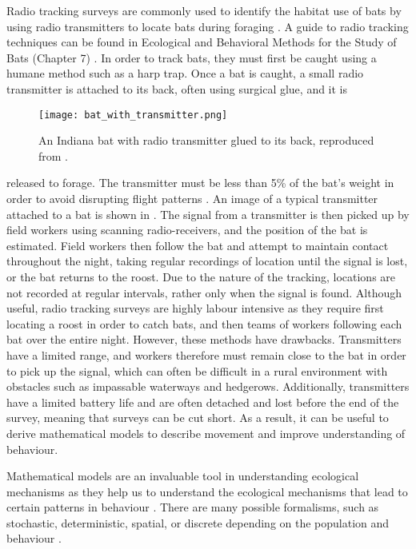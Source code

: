   Radio tracking surveys are commonly used to identify the habitat use of bats
   by using radio transmitters to
 locate bats during foraging
   \cite{Bontadina2002,
Encarnacao2005}. A guide to radio tracking techniques can be found in Ecological and Behavioral Methods for the Study of Bats (Chapter 7) \cite{kunz1988ecological}.
  In order to
 track bats, they must first be caught using a
humane method such as a harp trap.
 Once a bat is caught, a small radio
   transmitter is attached to its back, often using surgical glue, and it is
%
\begin{figure} [t!]
    \centering
        \texttt{[image: bat\_with\_transmitter.png]}
        \caption{An Indiana bat with radio transmitter glued to its back, reproduced from \cite{divolldataset}.
        }
    \label{fig:bat_tracker}
\end{figure}
%
 released to forage. The transmitter must be less than 5\% of the bat's weight in order to avoid disrupting flight patterns \cite{brigham1988load}. An image of a typical transmitter attached to a bat is shown in . The
  signal from a
transmitter is then picked up by field
 workers using scanning radio-receivers, and the position of the bat is
 estimated. Field workers then follow the bat and attempt to maintain contact
 throughout the night, taking regular recordings of location until the signal is
 lost, or the bat returns to
the roost. Due to the nature of the tracking,
 locations are not recorded at regular intervals, rather only when the signal is
 found. Although useful, radio
tracking surveys are highly labour intensive as
 they require first locating a
roost in order to catch bats, and then teams of
 workers following each bat over the entire night. However, these methods have drawbacks. Transmitters have a limited
 range, and workers therefore
must remain close to the bat in order to pick up
 the signal, which can often be
difficult in a rural environment with obstacles
 such as impassable waterways
and hedgerows. Additionally,
  transmitters have a
 limited battery life and are
often detached and lost before the end of the
 survey, meaning that surveys can
be cut short. As a result, it can be useful to derive mathematical models to describe movement and improve understanding of behaviour.


Mathematical models are an
invaluable tool in understanding
ecological
mechanisms as they help us to
understand the ecological mechanisms
that lead to certain patterns in behaviour
\cite{Ovaskainen2016}. There are
many possible formalisms, such as stochastic,
deterministic, spatial, or
discrete depending on the population and behaviour
\cite{Murray2011}.

